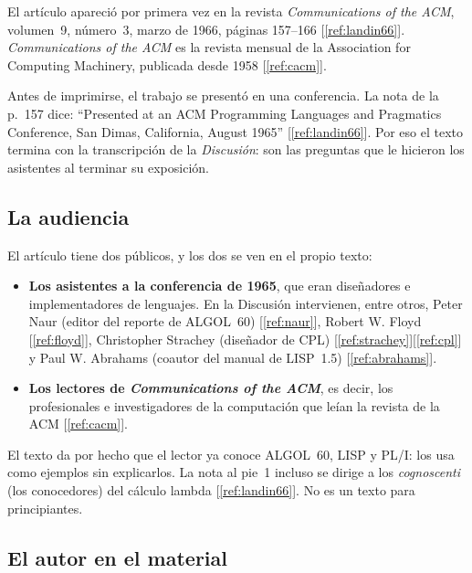 \documentclass[11pt,twoside,openany]{report}
\newcommand{\fuente}[1]{{\color{acento}[\ref{#1}]}}
\begin{document}
El artículo apareció por primera vez en la revista \emph{Communications of the ACM}, volumen~9, número~3, marzo de 1966, páginas 157--166 \fuente{ref:landin66}. \emph{Communications of the ACM} es la revista mensual de la Association for Computing Machinery, publicada desde 1958 \fuente{ref:cacm}.

Antes de imprimirse, el trabajo se presentó en una conferencia. La nota de la p.~157 dice: ``Presented at an ACM Programming Languages and Pragmatics Conference, San Dimas, California, August 1965'' \fuente{ref:landin66}. Por eso el texto termina con la transcripción de la \emph{Discusión}: son las preguntas que le hicieron los asistentes al terminar su exposición.

\subsection{La audiencia}

El artículo tiene dos públicos, y los dos se ven en el propio texto:

\begin{itemize}
  \item \textbf{Los asistentes a la conferencia de 1965}, que eran diseñadores e implementadores de lenguajes. En la Discusión intervienen, entre otros, Peter Naur (editor del reporte de ALGOL~60) \fuente{ref:naur}, Robert W. Floyd \fuente{ref:floyd}, Christopher Strachey (diseñador de CPL) \fuente{ref:strachey}\fuente{ref:cpl} y Paul W. Abrahams (coautor del manual de LISP~1.5) \fuente{ref:abrahams}.
  \item \textbf{Los lectores de \emph{Communications of the ACM}}, es decir, los profesionales e investigadores de la computación que leían la revista de la ACM \fuente{ref:cacm}.
\end{itemize}

El texto da por hecho que el lector ya conoce ALGOL~60, LISP y PL/I: los usa como ejemplos sin explicarlos. La nota al pie~1 incluso se dirige a los \emph{cognoscenti} (los conocedores) del cálculo lambda \fuente{ref:landin66}. No es un texto para principiantes.

\subsection{El autor en el material}
\end{document}
